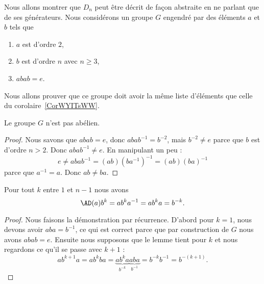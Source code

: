 \begin{normaltext}      \label{NORMooCCUEooRRENed}
	Nous allons montrer que \( D_n\) peut être décrit de façon abstraite en ne parlant que de ses générateurs. Nous considérons un groupe \( G\) engendré par des éléments \( a\) et \( b\) tels que
	\begin{enumerate}
		\item
		      \( a\) est d'ordre \( 2\),
		\item
		      \( b\) est d'ordre \( n\) avec \( n\geq 3\),
		\item
		      \( abab=e\).
	\end{enumerate}
	Nous allons prouver que ce groupe doit avoir la même liste d'éléments que celle du corolaire~\ref{CorWYITsWW}.
\end{normaltext}

\begin{proposition}
	Le groupe \( G\) n'est pas abélien.
\end{proposition}

\begin{proof}
	Nous savons que \( abab=e\), donc \( abab^{-1}=b^{-2}\), mais \( b^{-2}\neq e\) parce que \( b\) est d'ordre \( n>2\). Donc \( abab^{-1}\neq e\). En manipulant un peu :
	\begin{equation}
		e\neq abab^{-1}=(ab)(ba^{-1})^{-1}=(ab)(ba)^{-1}
	\end{equation}
	parce que \( a^{-1}=a\). Donc \( ab\neq ba\).
\end{proof}

\begin{lemma}        \label{LemKKXdqdL}
	Pour tout \( k\) entre \( 1\) et \( n-1\) nous avons
	\begin{equation}
		\AD(a)b^k=ab^ka^{-1}=ab^ka=b^{-k}.
	\end{equation}
\end{lemma}

\begin{proof}
	Nous faisons la démonstration par récurrence. D'abord pour \( k=1\), nous devons avoir \( aba=b^{-1}\), ce qui est correct parce que par construction de \( G\) nous avons \( abab=e\). Ensuite nous supposons que le lemme tient pour \( k\) et nous regardons ce qu'il se passe avec \( k+1\) :
	\begin{equation}
		ab^{k+1}a=ab^kba=\underbrace{ab^ka}_{b^{-k}}\underbrace{aba}_{b^{-1}}=b^{-k}b^{-1}=b^{-(k+1)}.
	\end{equation}
\end{proof}

